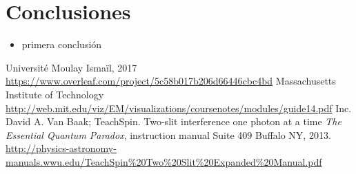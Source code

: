 \documentclass[%
 reprint,
 amsmath,amssymb,
 aps,
]{revtex4-1}
\begin{document}

\section{Conclusiones}
\begin{itemize}
    \item primera conclusión
\end{itemize}

\begin{thebibliography}{9}
Université Moulay Ismaïl, 2017
\url{https://www.overleaf.com/project/5c58b017b206d66446cbc4bd}
Massachusetts Institute of Technology
\url{http://web.mit.edu/viz/EM/visualizations/coursenotes/modules/guide14.pdf}
Inc. David A. Van Baak; TeachSpin. Two-slit interference one photon at a time \textit{The Essential Quantum Paradox}, instruction manual
Suite 409 Buffalo NY, 2013.
\url{http://physics-astronomy-manuals.wwu.edu/TeachSpin\%20Two\%20Slit\%20Expanded\%20Manual.pdf}
\end{thebibliography}
\end{document}
